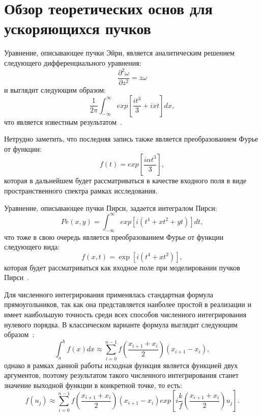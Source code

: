     \section{Обзор теоретических основ для ускоряющихся пучков}
    {
    Уравнение, описывающее пучки Эйри, является аналитическим решением
    следующего дифференциального уравнения:
    \begin{equation*}
        \label{1}
        \frac{\partial^2 \omega}{\partial z^2} = z \omega
    \end{equation*}
    и выглядит следующим образом:
    \begin{equation*}
        \label{2}
        \frac{1 }{2 \pi}\int_{- \infty}^{\infty} exp[{\frac{it^3}{3} + ixt}]dx,
    \end{equation*}
    что является известным результатом~\cite{Khonina_2011, math_func}.

    Нетрудно заметить, что последняя запись также является
    преобразованием Фурье от функции:
    \begin{equation*}
        \label{3}
        f(t) = exp[\frac{i \alpha t^3}{3}],
    \end{equation*}
    которая в дальнейшем будет рассматриваться в качестве входного поля в виде пространственного спектра
    рамках исследования.

    Уравнение, описывающее пучки Пирси, задается интегралом Пирси:
    \begin{equation*}
        \label{4}
        Pe(x, y)  = \int_{-\infty}^{\infty}exp[i(t^4 + xt^2 +yt)]dt,
    \end{equation*}
    что тоже в свою очередь является преобразованием Фурье от функции
    следующего вида:
    \begin{equation*}
        \label{5}
        f(x, t)  = \exp[i(t^4 + xt^2)],
    \end{equation*}
    которая будет рассматриваться как входное поле при моделировании пучков
    Пирси~\cite{pe_art}.

    Для численного интегрирования применялась стандартная формула
    прямоугольников, так как она представляется наиболее простой в реализации и
    имеет наибольшую точность среди всех способов численного интегрирования
    нулевого порядка. В классическом варианте формула выглядит следующим
    образом~\cite{samarsky}:
    \begin{equation*}
        \label{6}
        \int_a^b{f(x)dx} \approx \sum_{i=0}^{n-1} f(\frac{x_{i+1} + x_i}{2})(x_{i+1} - x_i),
    \end{equation*}
    однако в рамках данной работы исходная функция является функцией двух аргументов,
    поэтому результатом такого численного интегрирования станет значение
    выходной функции в конкретной точке, то есть:
    \begin{equation*}
        \label{7}
        f(u_j) \approx \sum_{i=0}^{n-1}f(\frac{x_{i+1}+x_i}{2})(x_{i+1} - x_i) exp[i \frac{k}{f}(\frac{x_{i+1}+x_i}{2})u_j].
    \end{equation*}

}
